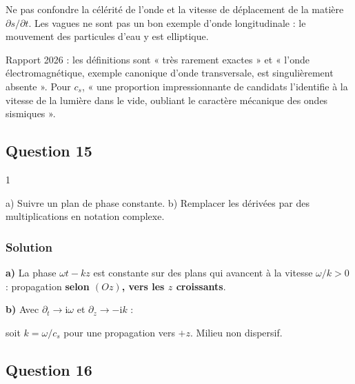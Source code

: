\documentclass[11pt,a4paper]{article}
\newcommand{\equationajustee}[1]{%
  \sbox{\boiteequation}{$\displaystyle #1$}%
  \ifdim\wd\boiteequation>\linewidth
    \[\resizebox{\linewidth}{!}{\usebox{\boiteequation}}\]%
  \else
    \[#1\]%
  \fi}
\begin{document}
\begin{piege}

Ne pas confondre la célérité de l'onde et la vitesse de déplacement de la matière \(\partial s/\partial t\). Les vagues ne sont pas un bon exemple d'onde longitudinale : le mouvement des particules d'eau y est elliptique.

\end{piege}

\begin{jury}

Rapport 2026 : les définitions sont « très rarement exactes » et « l'onde électromagnétique, exemple canonique d'onde transversale, est singulièrement absente ». Pour \(c_s\), « une proportion impressionnante de candidats l'identifie à la vitesse de la lumière dans le vide, oubliant le caractère mécanique des ondes sismiques ».

\end{jury}

\hypertarget{question-15}{%
\subsection{Question 15}\label{question-15}}

\begin{indication}{1}

a) Suivre un plan de phase constante. b) Remplacer les dérivées par des multiplications en notation complexe.

\end{indication}

\hypertarget{solution-14}{%
\subsubsection{Solution}\label{solution-14}}

\textbf{a)} La phase \(\omega t-kz\) est constante sur des plans qui avancent à la vitesse \(\omega/k>0\) : propagation \textbf{selon \((Oz)\), vers les \(z\) croissants}.

\textbf{b)} Avec \(\partial_t\to\mathrm{i}\omega\) et \(\partial_z\to-\mathrm{i}k\) :

\equationajustee{\boxed{k^2=\frac{\omega^2}{c_s^2}}}

soit \(k=\omega/c_s\) pour une propagation vers \(+z\). Milieu non dispersif.

\hypertarget{question-16}{%
\subsection{Question 16}\label{question-16}}
\end{document}
